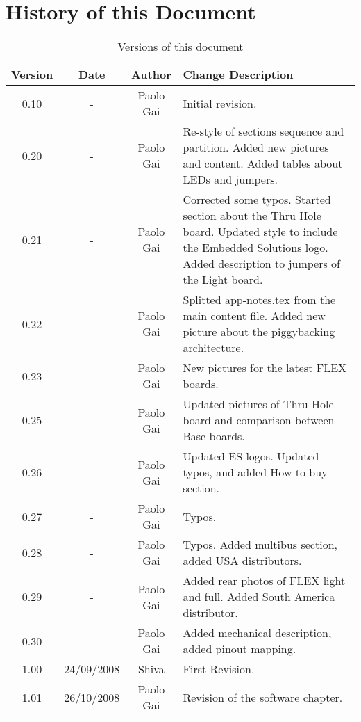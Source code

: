 \section{History of this Document}
\label{sec:hist_doc}
\begin{small}
\begin{table}[ht]
\centering
  \begin{tabular}{|c|c|c|p{}|}
    \hline
    {\bf Version} & {\bf Date} & {\bf Author} & {\bf Change Description}\\
    \hline \hline
    0.10 & - & Paolo Gai & Initial revision.\\
    \hline
    0.20 & - & Paolo Gai & Re-style of sections sequence and partition. Added new pictures and content. Added tables about LEDs and jumpers.\\
    \hline
    0.21 & - & Paolo Gai & Corrected some typos. Started section about the Thru Hole board. Updated style to include the Embedded Solutions logo. Added description to jumpers of the Light board.\\
    \hline
    0.22 & - & Paolo Gai & Splitted app-notes.tex from the main content file. Added new picture about the piggybacking architecture.\\
    \hline
    0.23 & - & Paolo Gai & New pictures for the latest FLEX boards.\\
    \hline
    0.25 & - & Paolo Gai & Updated pictures of Thru Hole board and comparison between Base boards.\\
    \hline
    0.26 & - & Paolo Gai & Updated ES logos. Updated typos, and added How to buy section.\\
    \hline
    0.27 & - & Paolo Gai & Typos.\\
    \hline
    0.28 & - & Paolo Gai & Typos. Added multibus section, added USA distributors.\\
    \hline
    0.29 & - & Paolo Gai & Added rear photos of FLEX light and full. Added South America distributor.\\
    \hline
    0.30 & - & Paolo Gai & Added mechanical description, added pinout mapping.\\
    \hline
    1.00 & 24/09/2008 & Shiva & First Revision.\\
    \hline
    1.01 & 26/10/2008 & Paolo Gai & Revision of the software chapter.\\
    \hline
  \end{tabular}
\caption{Versions of this document}
\label{tbl:versions}
\end{table}
\end{small}
